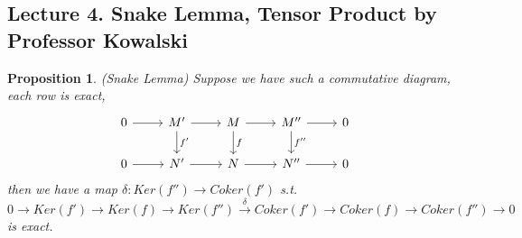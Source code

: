 \documentclass[11pt]{article}
\newtheorem{prop}[thm]{Proposition}
\newcommand{\rta}{\rightarrow}
\newcommand{\lrta}{\longrightarrow}
\begin{document}
\subsection{Lecture 4. Snake Lemma, Tensor Product by Professor Kowalski}
\begin{prop}(Snake Lemma)
Suppose we have such a commutative diagram, each row is exact, 
\[
\begin{tikzcd}
0\arrow[r]  & M'  \arrow[r]\arrow[d,"f'"] & M\arrow[r] \arrow[d,"f"] & M''\arrow[r] \arrow[d,"f''"] & 0 \\
0\arrow[r]  & N'  \arrow[r] & N\arrow[r] & N''\arrow[r]  & 0 
\end{tikzcd}
\]
then we have a map $\delta: Ker(f'')\lrta Coker(f')$ s.t.  
$$
0\lrta Ker(f')\lrta Ker(f)\rta Ker(f'')\overset{\delta}{\lrta}Coker(f')\lrta Coker(f)\lrta Coker(f'')\lrta 0 
$$
is exact.
\end{prop}
\end{document}
